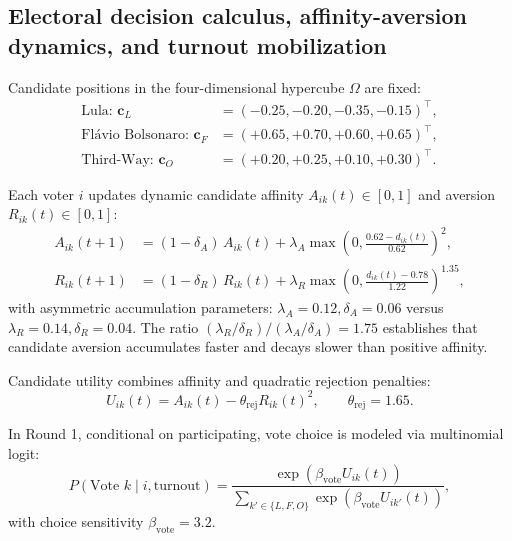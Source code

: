 \documentclass[11pt,a4paper]{article}
\begin{document}
\subsection{Electoral decision calculus, affinity-aversion dynamics, and turnout mobilization}
\label{sssec:electoral_decision_calculus}
Candidate positions in the four-dimensional hypercube $\Omega$ are fixed:
\begin{align}
    \text{Lula: } \mathbf{c}_L &= (-0.25, -0.20, -0.35, -0.15)^{\top}, \label{eq:coord_lula} \\
    \text{Fl\'avio Bolsonaro: } \mathbf{c}_F &= (+0.65, +0.70, +0.60, +0.65)^{\top}, \label{eq:coord_flavio} \\
    \text{Third-Way: } \mathbf{c}_O &= (+0.20, +0.25, +0.10, +0.30)^{\top}. \label{eq:coord_thirdway}
\end{align}

Each voter $i$ updates dynamic candidate affinity $A_{ik}(t) \in [0, 1]$ and aversion $R_{ik}(t) \in [0, 1]$:
\begin{align}
    A_{ik}(t+1) &= (1 - \delta_A)\,A_{ik}(t) + \lambda_A \max\!\left(0, \frac{0.62 - d_{ik}(t)}{0.62}\right)^2, \label{eq:affinity_evolution} \\
    R_{ik}(t+1) &= (1 - \delta_R)\,R_{ik}(t) + \lambda_R \max\!\left(0, \frac{d_{ik}(t) - 0.78}{1.22}\right)^{1.35}, \label{eq:aversion_evolution}
\end{align}
with asymmetric accumulation parameters: $\lambda_A = 0.12, \delta_A = 0.06$ versus $\lambda_R = 0.14, \delta_R = 0.04$. The ratio $(\lambda_R / \delta_R) / (\lambda_A / \delta_A) = 1.75$ establishes that candidate aversion accumulates faster and decays slower than positive affinity.

Candidate utility combines affinity and quadratic rejection penalties:
\begin{equation}
    U_{ik}(t) = A_{ik}(t) - \theta_{\mathrm{rej}} R_{ik}(t)^2, \qquad \theta_{\mathrm{rej}} = 1.65.
    \label{eq:candidate_utility}
\end{equation}

In Round 1, conditional on participating, vote choice is modeled via multinomial logit:
\begin{equation}
    P(\text{Vote } k \mid i, \text{turnout}) = \frac{\exp(\beta_{\mathrm{vote}} U_{ik}(t))}{\sum_{k' \in \{L, F, O\}} \exp(\beta_{\mathrm{vote}} U_{ik'}(t))},
    \label{eq:multinomial_logit_r1}
\end{equation}
with choice sensitivity $\beta_{\mathrm{vote}} = 3.2$.
\end{document}
